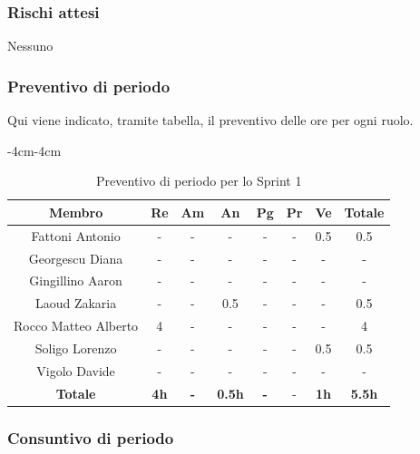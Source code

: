 \documentclass[a4paper,12pt]{article}
\begin{document}
\subsubsection{Rischi attesi}
Nessuno

\subsubsection{Preventivo di periodo}
Qui viene indicato, tramite tabella, il preventivo delle ore per ogni ruolo.
\begin{table}[H]
    \begin{adjustwidth}{-4cm}{-4cm}
    \centering
    \begin{tabular}{|c|c|c|c|c|c|c|c|}
        \hline
        \textbf{Membro}& \textbf{Re} & \textbf{Am} & \textbf{An} & \textbf{Pg} & \textbf{Pr} & \textbf{Ve} & \textbf{Totale} \\
        \hline
        Fattoni Antonio & - & - & - & - & - & 0.5& 0.5\\
        \hline
        Georgescu Diana& - & - & - & - & - & - & - \\
        \hline
        Gingillino Aaron& - & - & - & - & - & - & - \\
        \hline
        Laoud Zakaria& - & - & 0.5& - & - & - & 0.5\\
        \hline
        Rocco Matteo Alberto& 4& -& -& -& -& -&4\\
        \hline
        Soligo Lorenzo& -& -& -& -& -& 0.5&0.5\\
        \hline
        Vigolo Davide& -& -& -& -& -& -&-\\
        \hline
        \textbf{Totale} & \textbf{4h}& \textbf{-} & \textbf{0.5h}& \textbf{-}& -& \textbf{1h}& \textbf{5.5h}\\
        \hline
    \end{tabular}
    \caption{Preventivo di periodo per lo Sprint 1}
    \end{adjustwidth}
\end{table}

\subsubsection{Consuntivo di periodo}
\end{document}
